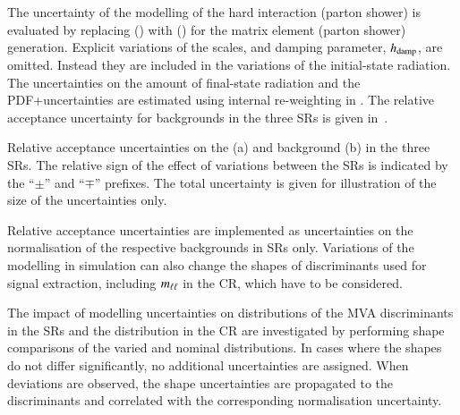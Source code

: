 The uncertainty of the modelling of the hard interaction (parton shower) is
evaluated by replacing \POWHEGBOX[v2] (\PYTHIA[8]) with \MGNLO (\HERWIG[7]) for
the matrix element (parton shower) generation. Explicit variations of the
scales, and \PYTHIA[8] damping parameter, $h_\mathrm{damp}$, are omitted. Instead they
are included in the variations of the initial-state radiation. The uncertainties
on the amount of final-state radiation and the PDF+\alphas uncertainties are
estimated using internal re-weighting in \PYTHIA[8]. The relative acceptance
uncertainty for \ttbar backgrounds in the three SRs is given
in~.

\begin{table}[htbp]
  \centering

  \caption{Relative acceptance uncertainties on the \ZHF (a) and \ttbar
    background (b) in the three SRs. The relative sign of the effect of
    variations between the SRs is indicated by the ``$\pm$'' and ``$\mp$''
    prefixes. The total uncertainty is given for illustration of the size of the
    uncertainties only.}

  \begin{subtable}[t]{0.95\textwidth}
    \centering
    \label{tab:uncertainties_zhf_extrapol}

    
  \end{subtable}

  \vspace{10pt}

  \begin{subtable}[t]{0.95\textwidth}
    \centering
    \label{tab:uncertainties_ttbar_extrapol}

    
  \end{subtable}
\end{table}

Relative acceptance uncertainties are implemented as uncertainties on the
normalisation of the respective backgrounds in SRs only. Variations of the
modelling in simulation can also change the shapes of discriminants used for
signal extraction, including $m_{\ell\ell}$ in the \ZHF CR, which have to be considered.

The impact of modelling uncertainties on distributions of the MVA discriminants
in the SRs and the \mll distribution in the \ZHF CR are investigated by
performing shape comparisons of the varied and nominal distributions. In cases
where the shapes do not differ significantly, no additional uncertainties are
assigned.  When deviations are observed, the shape uncertainties are propagated
to the discriminants and correlated with the corresponding normalisation
uncertainty.


